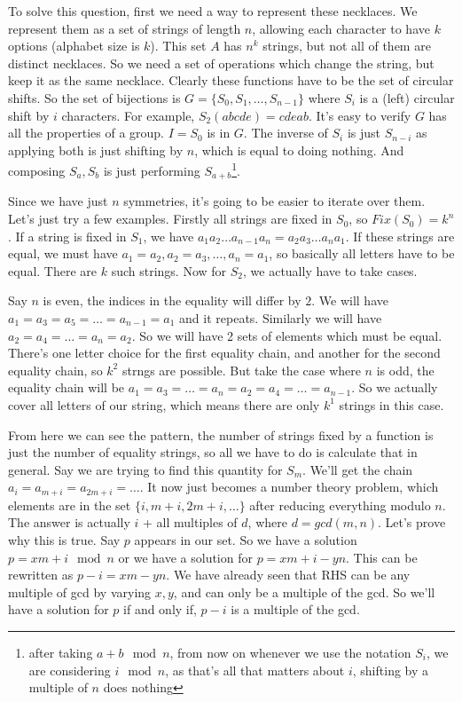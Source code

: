 \documentclass[a4paper,10pt]{article}
\theoremstyle{definition} %
\begin{document}
    To solve this question, first we need a way to represent these necklaces. We represent them as a set of strings of length $n$, allowing each character to have $k$ options (alphabet size is $k$).
    This set $A$ has $n^k$ strings, but not all of them are distinct necklaces. So we need a set of operations which change the string, but keep it as the same necklace. Clearly these functions have 
    to be the set of circular shifts. So the set of bijections is $G = \{S_0, S_1, \dots, S_{n-1}\}$ where $S_i$ is a (left) circular shift by $i$ characters. For example, $S_2(abcde) = cdeab$. It's
    easy to verify $G$ has all the properties of a group. $I = S_0$ is in $G$. The inverse of $S_i$ is just $S_{n-i}$ as applying both is just shifting by $n$, which is equal to doing nothing. And composing
    $S_a, S_b$ is just performing $S_{a+b}$\footnote{after taking $a+b \mod n$, from now on whenever we use the notation $S_i$, we are considering $i \mod n$, as that's all that matters about $i$, shifting by a 
    multiple of $n$ does nothing}.

    Since we have just $n$ symmetries, it's going to be easier to iterate over them. Let's just try a few examples. Firstly all strings are fixed in $S_0$, so $Fix(S_0) = k^n$. If a string is fixed in $S_1$, we have
    $a_1a_2 \dots a_{n-1}a_n = a_2a_3 \dots a_{n}a_1$. If these strings are equal, we must have $a_1 = a_2, a_2 = a_3, \dots, a_n = a_1$, so basically all letters have to be equal. There are $k$ such strings. Now for $S_2$, 
    we actually have to take cases.

    Say $n$ is even, the indices in the equality will differ by $2$. We will have $a_1 = a_3 = a_5 = \dots = a_{n-1} = a_1$ and it repeats. Similarly we will have $a_2 = a_4 = \dots = a_n = a_2$. So we will have 2 sets of 
    elements which must be equal. There's one letter choice for the first equality chain, and another for the second equality chain, so $k^2$ strngs are possible. But take the case where $n$ is odd, the equality chain will
    be $a_1 = a_3 = \dots = a_n = a_2 = a_4 = \dots = a_{n-1}$. So we actually cover all letters of our string, which means there are only $k^1$ strings in this case.

    From here we can see the pattern, the number of strings fixed by a function is just the number of equality strings, so all we have to do is calculate that in general. Say we are trying to find this quantity for $S_m$.
    We'll get the chain $a_i = a_{m+i} = a_{2m+i} = \dots$. It now just becomes a number theory problem, which elements are in the set $\{i, m+i, 2m+i, \dots\}$ after reducing everything modulo $n$. The answer is actually
    $i$ + all multiples of $d$, where $d = gcd(m,n)$. Let's prove why this is true. Say $p$ appears in our set. So we have a solution $p = xm + i \mod n$ or we have a solution for $p = xm + i - yn$. This can be rewritten as 
    $p - i = xm - yn$. We have already seen that RHS can be any multiple of gcd by varying $x, y$, and can only be a multiple of the gcd. So we'll have a solution for $p$ if and only if, $p - i$ is a multiple of the gcd.
\end{document}
